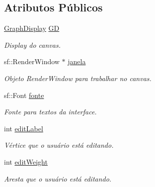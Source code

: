 \subsection*{Atributos Públicos}
\begin{DoxyCompactItemize}
\item 
\mbox{\label{classGraphCanvas_a7e2f16ce3638db53fb73061fe1c93f15}} 
\mbox{\hyperlink{classGraphDisplay}{Graph\+Display}} \mbox{\hyperlink{classGraphCanvas_a7e2f16ce3638db53fb73061fe1c93f15}{GD}}
\begin{DoxyCompactList}\small\item\em Display do canvas. \end{DoxyCompactList}\item 
\mbox{\label{classGraphCanvas_acbae5a92eb6cdc7cd7714093295f5412}} 
sf\+::\+Render\+Window $\ast$ \mbox{\hyperlink{classGraphCanvas_acbae5a92eb6cdc7cd7714093295f5412}{janela}}
\begin{DoxyCompactList}\small\item\em Objeto Render\+Window para trabalhar no canvas. \end{DoxyCompactList}\item 
\mbox{\label{classGraphCanvas_a74e79b17a3bbfa10dfa1bbe9f1aeb47d}} 
sf\+::\+Font \mbox{\hyperlink{classGraphCanvas_a74e79b17a3bbfa10dfa1bbe9f1aeb47d}{fonte}}
\begin{DoxyCompactList}\small\item\em Fonte para textos da interface. \end{DoxyCompactList}\item 
\mbox{\label{classGraphCanvas_a65406a215bd30e44358031c5b8a2cc2b}} 
int \mbox{\hyperlink{classGraphCanvas_a65406a215bd30e44358031c5b8a2cc2b}{edit\+Label}}
\begin{DoxyCompactList}\small\item\em Vértice que o usuário está editando. \end{DoxyCompactList}\item 
\mbox{\label{classGraphCanvas_a3b81b5c942b2fe3d94952d7ce664d3ed}} 
int \mbox{\hyperlink{classGraphCanvas_a3b81b5c942b2fe3d94952d7ce664d3ed}{edit\+Weight}}
\begin{DoxyCompactList}\small\item\em Aresta que o usuário está editando. \end{DoxyCompactList}\end{DoxyCompactItemize}


